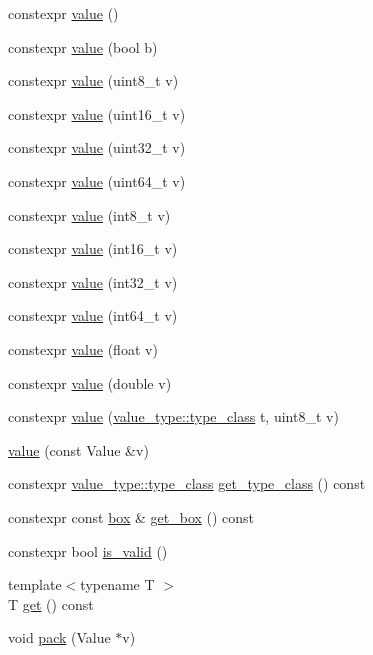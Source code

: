 \begin{DoxyCompactItemize}
\item 
constexpr \hyperlink{classtelegraph_1_1value_a0d68e7b123903adee0527771007ef9bb}{value} ()
\item 
constexpr \hyperlink{classtelegraph_1_1value_acdf151d4a74fc89dbf713b6a3bc010e7}{value} (bool b)
\item 
constexpr \hyperlink{classtelegraph_1_1value_ad60a01207482efd28cdfbe9d38618d44}{value} (uint8\+\_\+t v)
\item 
constexpr \hyperlink{classtelegraph_1_1value_a5d635c910bd217cbd8bf44a9ad92b8d6}{value} (uint16\+\_\+t v)
\item 
constexpr \hyperlink{classtelegraph_1_1value_ab893e01cc0191c29681122e70febf0eb}{value} (uint32\+\_\+t v)
\item 
constexpr \hyperlink{classtelegraph_1_1value_a74a4b302ca334adb99eac3e14e2cc9f0}{value} (uint64\+\_\+t v)
\item 
constexpr \hyperlink{classtelegraph_1_1value_abec206177d942003c27a025c5b430649}{value} (int8\+\_\+t v)
\item 
constexpr \hyperlink{classtelegraph_1_1value_a79305dd1e9fcc13a7059b9605642ce2b}{value} (int16\+\_\+t v)
\item 
constexpr \hyperlink{classtelegraph_1_1value_ac6e027b6a9687c477ae78c19aa35935a}{value} (int32\+\_\+t v)
\item 
constexpr \hyperlink{classtelegraph_1_1value_abfa29a624716fa98577f810fc96c0f87}{value} (int64\+\_\+t v)
\item 
constexpr \hyperlink{classtelegraph_1_1value_ac0ec66475ec076cf9f7a76e0a5b804d4}{value} (float v)
\item 
constexpr \hyperlink{classtelegraph_1_1value_af0ad714556beb9cac21b887c4e67055f}{value} (double v)
\item 
constexpr \hyperlink{classtelegraph_1_1value_ad96b01fa30ad481c4695df1d06e9aa12}{value} (\hyperlink{classtelegraph_1_1value__type_a516081c0a4e231cb22554f48f052ff6f}{value\+\_\+type\+::type\+\_\+class} t, uint8\+\_\+t v)
\item 
\hyperlink{classtelegraph_1_1value_a3fad9e2214835f095af02feb1f91c49a}{value} (const Value \&v)
\item 
constexpr \hyperlink{classtelegraph_1_1value__type_a516081c0a4e231cb22554f48f052ff6f}{value\+\_\+type\+::type\+\_\+class} \hyperlink{classtelegraph_1_1value_ae38e5de94d5cfad919efe224da5a6c7d}{get\+\_\+type\+\_\+class} () const
\item 
constexpr const \hyperlink{uniontelegraph_1_1value_1_1box}{box} \& \hyperlink{classtelegraph_1_1value_a79d73fbd3e172c33f11fdf7fead2b97a}{get\+\_\+box} () const
\item 
constexpr bool \hyperlink{classtelegraph_1_1value_ad37d892925ba112c70d6c090c3623dd2}{is\+\_\+valid} ()
\item 
{\footnotesize template$<$typename T $>$ }\\T \hyperlink{classtelegraph_1_1value_a201fca0737b8be3128f2770b41087540}{get} () const
\item 
void \hyperlink{classtelegraph_1_1value_abc2188de92998eb93f801780370c56da}{pack} (Value $\ast$v)
\end{DoxyCompactItemize}
